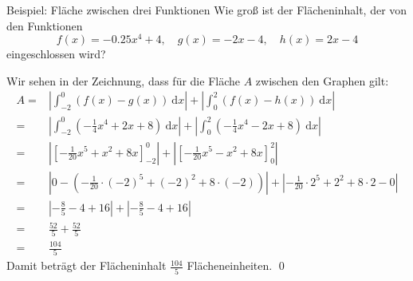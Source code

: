 \documentclass[german]{spicker}
\renewcommand{\abs}[1]{\left| #1 \right|}
\newcommand{\dx}{~\mathrm{d}x}
\begin{document}
\begin{bonus}{Beispiel: Fläche zwischen drei Funktionen}
    Wie groß ist der Flächeninhalt, der von den Funktionen
    $$
        f(x) = -0.25x^4 + 4, \quad g(x) = -2x-4, \quad h(x) = 2x-4
    $$
    eingeschlossen wird?
    \begin{center}
    \end{center}

    Wir sehen in der Zeichnung, dass für die Fläche $A$ zwischen den Graphen gilt:
    $$
        \begin{aligned}
            A ={} & \abs{  \int_{-2}^{0} \left(f(x) - g(x)\right) \dx} + \abs{ \int_{0}^{2} \left(f(x) - h(x)\right) \dx}                           \\
            ={}   & \abs{ \int_{-2}^{0} \left(-\frac{1}{4}x^4 + 2x + 8\right) \dx} + \abs{ \int_{0}^{2} \left(-\frac{1}{4}x^4 - 2x + 8\right) \dx}  \\
            ={}   & \abs{ \left[ -\frac{1}{20}x^5 + x^2 + 8x \right]_{-2}^{0} } + \abs{ \left[ -\frac{1}{20}x^5 - x^2 + 8x \right]_0^2 }            \\
            ={}   & \abs{ 0 - \left( -\frac{1}{20}\cdot(-2)^5 + (-2)^2 + 8\cdot(-2) \right) } + \abs{ -\frac{1}{20}\cdot 2^5 + 2^2 + 8\cdot 2 - 0 } \\
            ={}   & \abs{-\frac{8}{5} - 4 + 16 } + \abs{-\frac{8}{5} - 4 + 16}                                                                      \\
            ={}   & \frac{52}{5} + \frac{52}{5}                                                                                                     \\
            ={}   & \frac{104}{5}
        \end{aligned}
    $$
    Damit beträgt der Flächeninhalt $\frac{104}{5}$ Flächeneinheiten. \qed
\end{bonus}
\end{document}
